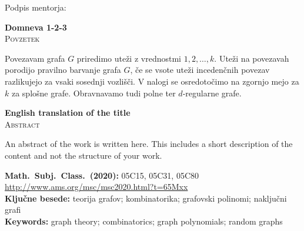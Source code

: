 \documentclass[12pt,a4paper,twoside]{article}
\newcommand{\naslovdela}{Domneva 1-2-3}
\newcommand{\kljucnebesede}{teorija grafov\sep kombinatorika\sep grafovski polinomi\sep naključni grafi} %
\newcommand{\keywords}{graph theory\sep combinatorics\sep graph polynomials\sep random graphs} %
\newcommand{\sep}{, }  %
\theoremstyle{definition} %
\theoremstyle{plain} %
\numberwithin{equation}{section}  %
\def\sep{; }
\begin{document}
\vspace{2cm}
\hspace*{\fill} Podpis mentorja: \phantom{prostor za podpis}


\cleardoublepage
{}

\begin{center}
\textbf{\naslovdela} \\[3mm]
\textsc{Povzetek} \\[2mm]
\end{center}
Povezavam grafa $G$ priredimo uteži z vrednostmi $1,2,\ldots,k$. Uteži na povezavah porodijo pravilno barvanje grafa $G$, če se vsote uteži incedenčnih povezav razlikujejo za vsaki sosednji vozlišči. V nalogi se osredotočimo na zgornjo mejo za $k$ za splošne grafe. Obravnavamo tudi polne ter $d$-regularne grafe. 

\vfill
\begin{center}
\textbf{English translation of the title} \\[3mm] %
\textsc{Abstract}\\[2mm]
\end{center}

An abstract of the work is written here. This includes a short description of
the content and not the structure of your work.

\vfill\noindent
\textbf{Math.~Subj.~Class.~(2020):} 05C15, 05C31, 05C80    
\url{http://www.ams.org/msc/msc2020.html?t=65Mxx} \\[1mm]
\textbf{Ključne besede:} \kljucnebesede \\[1mm]
\textbf{Keywords:} \keywords

\cleardoublepage

\setcounter{page}{1}    %
\end{document}
